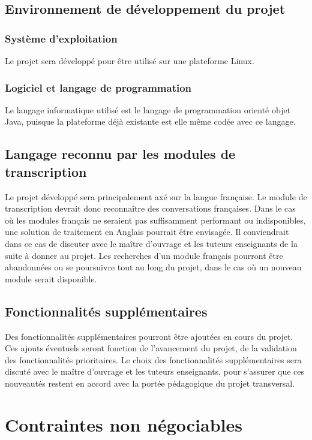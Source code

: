 			\subsection{Environnement de développement du projet}
			\subsubsection{Système d'exploitation}
   			Le projet sera développé pour être utilisé sur une plateforme Linux. 

			\subsubsection{Logiciel et langage de programmation}
			 Le langage informatique utilisé est le langage de programmation orienté objet Java, puisque la plateforme déjà existante est elle même codée avec ce langage. 

			\subsection{Langage reconnu par les modules de transcription}
			Le projet développé sera principalement axé sur la langue française. Le module de transcription devrait donc reconnaître des conversations françaises. Dans le cas où les modules français ne seraient pas suffisamment performant ou indisponibles, une solution de traitement en Anglais pourrait être envisagée. Il conviendrait dans ce cas de discuter avec le maître d'ouvrage et les tuteurs enseignants de la suite à donner au projet. Les recherches d'un module français pourront être abandonnées ou se poursuivre tout au long du projet, dans le cas où un nouveau module serait disponible. 

			\subsection{Fonctionnalités supplémentaires}
			Des fonctionnalités supplémentaires pourront être ajoutées en cours du projet. Ces ajouts éventuels seront fonction de l'avancement du projet, de la validation des fonctionnalités prioritaires. Le choix des fonctionnalités supplémentaires sera discuté avec le maître d'ouvrage et les tuteurs enseignants, pour s'assurer que ces nouveautés restent en accord avec la portée pédagogique du projet transversal. 

		\section{Contraintes non négociables}
